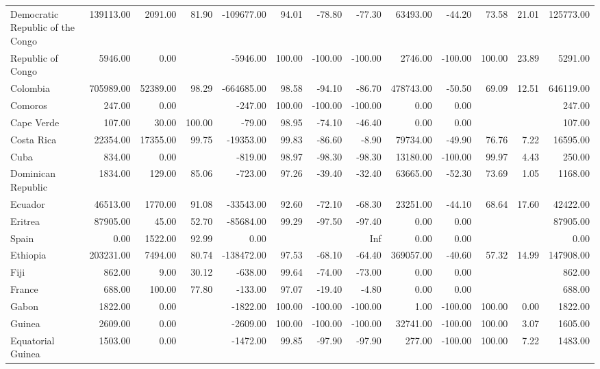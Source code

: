 \begin{table}[ht]
\begin{tabular}{lrrrrrrrrrrrr}
  Democratic Republic of the Congo & 139113.00 & 2091.00 & 81.90 & -109677.00 & 94.01 & -78.80 & -77.30 & 63493.00 & -44.20 & 73.58 & 21.01 & 125773.00 \\ 
  Republic of Congo & 5946.00 & 0.00 &  & -5946.00 & 100.00 & -100.00 & -100.00 & 2746.00 & -100.00 & 100.00 & 23.89 & 5291.00 \\ 
  Colombia & 705989.00 & 52389.00 & 98.29 & -664685.00 & 98.58 & -94.10 & -86.70 & 478743.00 & -50.50 & 69.09 & 12.51 & 646119.00 \\ 
  Comoros & 247.00 & 0.00 &  & -247.00 & 100.00 & -100.00 & -100.00 & 0.00 & 0.00 &  &  & 247.00 \\ 
  Cape Verde & 107.00 & 30.00 & 100.00 & -79.00 & 98.95 & -74.10 & -46.40 & 0.00 & 0.00 &  &  & 107.00 \\ 
  Costa Rica & 22354.00 & 17355.00 & 99.75 & -19353.00 & 99.83 & -86.60 & -8.90 & 79734.00 & -49.90 & 76.76 & 7.22 & 16595.00 \\ 
  Cuba & 834.00 & 0.00 &  & -819.00 & 98.97 & -98.30 & -98.30 & 13180.00 & -100.00 & 99.97 & 4.43 & 250.00 \\ 
  Dominican Republic & 1834.00 & 129.00 & 85.06 & -723.00 & 97.26 & -39.40 & -32.40 & 63665.00 & -52.30 & 73.69 & 1.05 & 1168.00 \\ 
  Ecuador & 46513.00 & 1770.00 & 91.08 & -33543.00 & 92.60 & -72.10 & -68.30 & 23251.00 & -44.10 & 68.64 & 17.60 & 42422.00 \\ 
  Eritrea & 87905.00 & 45.00 & 52.70 & -85684.00 & 99.29 & -97.50 & -97.40 & 0.00 & 0.00 &  &  & 87905.00 \\ 
  Spain & 0.00 & 1522.00 & 92.99 & 0.00 &  &  & Inf & 0.00 & 0.00 &  &  & 0.00 \\ 
  Ethiopia & 203231.00 & 7494.00 & 80.74 & -138472.00 & 97.53 & -68.10 & -64.40 & 369057.00 & -40.60 & 57.32 & 14.99 & 147908.00 \\ 
  Fiji & 862.00 & 9.00 & 30.12 & -638.00 & 99.64 & -74.00 & -73.00 & 0.00 & 0.00 &  &  & 862.00 \\ 
  France & 688.00 & 100.00 & 77.80 & -133.00 & 97.07 & -19.40 & -4.80 & 0.00 & 0.00 &  &  & 688.00 \\ 
  Gabon & 1822.00 & 0.00 &  & -1822.00 & 100.00 & -100.00 & -100.00 & 1.00 & -100.00 & 100.00 & 0.00 & 1822.00 \\ 
  Guinea & 2609.00 & 0.00 &  & -2609.00 & 100.00 & -100.00 & -100.00 & 32741.00 & -100.00 & 100.00 & 3.07 & 1605.00 \\ 
  Equatorial Guinea & 1503.00 & 0.00 &  & -1472.00 & 99.85 & -97.90 & -97.90 & 277.00 & -100.00 & 100.00 & 7.22 & 1483.00 \\ 

\end{tabular}
\end{table}
